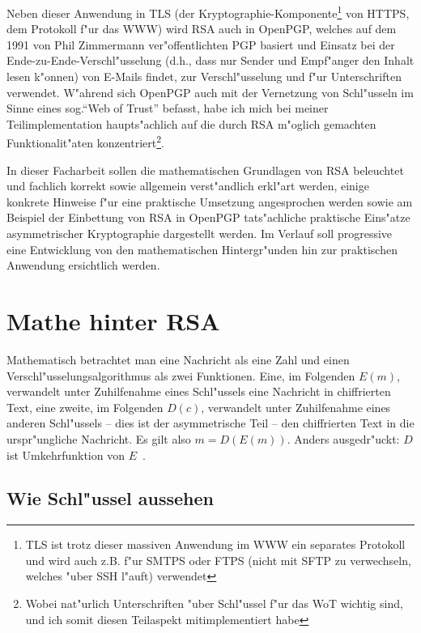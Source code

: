 \documentclass[12pt]{article}
\begin{document}
Neben dieser Anwendung in TLS (der Kryptographie-Komponente\footnote{
TLS ist trotz dieser massiven Anwendung im WWW ein separates Protokoll und wird auch z.B. f"ur SMTPS oder FTPS (nicht mit SFTP zu verwechseln, welches "uber SSH l"auft) verwendet}
von HTTPS, dem Protokoll f"ur das WWW) wird RSA auch in OpenPGP,
welches auf dem 1991 von Phil Zimmermann ver"offentlichten PGP basiert und Einsatz bei der Ende-zu-Ende-Verschl"usselung
(d.h., dass nur Sender und Empf"anger den Inhalt lesen k"on\-nen)
von E-Mails findet, zur Verschl"usselung und f"ur Unterschriften verwendet.
W"ah\-rend sich OpenPGP auch mit der Vernetzung von Schl"usseln im Sinne eines sog.\@ "`Web of Trust"' befasst,
habe ich mich bei meiner Teilimplementation haupts"achlich auf die durch RSA m"oglich gemachten
Funktionalit"aten konzentriert\footnote{Wobei nat"urlich Unterschriften "uber Schl"ussel f"ur das WoT wichtig sind, und ich somit diesen Teilaspekt mitimplementiert habe}.

In dieser Facharbeit sollen die mathematischen Grundlagen von RSA beleuchtet und
fachlich korrekt sowie allgemein verst"andlich erkl"art werden,
einige konkrete Hinweise f"ur eine praktische Umsetzung angesprochen werden
sowie am Beispiel der Einbettung von RSA in OpenPGP tats"achliche praktische
Eins"atze asymmetrischer Kryptographie dargestellt werden.
Im Verlauf soll progressive eine Entwicklung von den mathematischen Hintergr"unden
hin zur praktischen Anwendung ersichtlich werden.

\section{Mathe hinter RSA}

Mathematisch betrachtet man eine Nachricht als eine Zahl und einen
Ver\-schl"us\-sel\-ungs\-al\-go\-rith\-mus als zwei Funktionen.
Eine, im Folgenden $E(m)$, verwandelt unter Zuhilfenahme eines Schl"ussels eine
Nachricht in chiffrierten Text, eine zweite, im Folgenden $D(c)$,
verwandelt unter Zuhilfenahme eines anderen Schl"ussels -- dies ist der asymmetrische Teil --
den chiffrierten Text in die urspr"ungliche Nachricht.
Es gilt also $m = D(E(m))$.
Anders ausgedr"uckt: $D$ ist Umkehrfunktion von $E$~\cite{rsa}.

\subsection{Wie Schl"ussel aussehen}
\label{subsec:rsa:keys}
\end{document}
